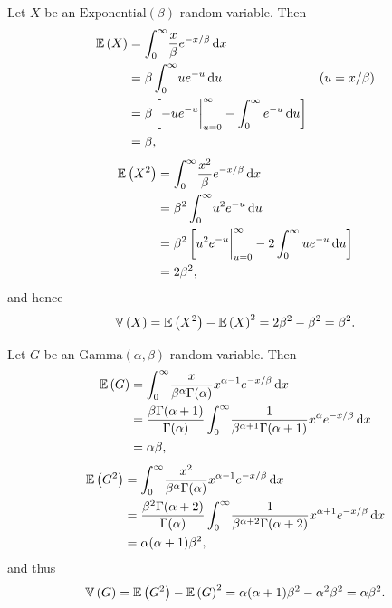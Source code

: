 \begin{ex}
  Let $X$ be an $\text{Exponential}(\beta)$ random variable. Then
  \begin{align*}
    \mathbb{E}\left(X\right)
     & =\int_0^\infty\!\frac{x}{\beta}e^{-x/\beta}\,\mathrm{d}{x}                                            \\
     & =\beta\int_0^\infty\!ue^{-u}\,\mathrm{d}{u}                                             & (u=x/\beta) \\
     & =\beta\left[-ue^{-u}\bigg\rvert_{u=0}^\infty-\int_0^\infty e^{-u}\,\mathrm{d}{u}\right]               \\
     & =\beta,
  \end{align*}
  \begin{align*}
    \mathbb{E}\left(X^2\right)
     & =\int_0^\infty\!\frac{x^2}{\beta}e^{-x/\beta}\,\mathrm{d}{x}                                  \\
     & =\beta^2\int_0^\infty\!u^2e^{-u}\,\mathrm{d}{u}                                               \\
     & =\beta^2\left[u^2e^{-u}\bigg\rvert_{u=0}^\infty-2\int_0^\infty ue^{-u}\,\mathrm{d}{u} \right] \\
     & =2\beta^2,
  \end{align*}
  and hence
  \[
    \mathbb{V}\left(X\right)
    =\mathbb{E}\left(X^2\right)-\mathbb{E}\left(X\right)^2
    =2\beta^2-\beta^2=\beta^2.
  \]

  Let $G$ be an $\text{Gamma}(\alpha, \beta)$ random variable. Then
  \begin{align*}
    \mathbb{E}\left(G\right)
     & =\int_0^\infty\!\frac{x}{\beta^\alpha\Gamma(\alpha)}x^{\alpha-1}e^{-x/\beta}\,\mathrm{d}{x}                                                 \\
     & =\frac{\beta\Gamma(\alpha+1)}{\Gamma(\alpha)}\int_0^\infty\!\frac{1}{\beta^{\alpha+1}\Gamma(\alpha+1)}x^{\alpha}e^{-x/\beta}\,\mathrm{d}{x} \\
     & =\alpha\beta,
  \end{align*}
  \begin{align*}
    \mathbb{E}\left(G^2\right)
     & =\int_0^\infty\!\frac{x^2}{\beta^\alpha\Gamma(\alpha)}x^{\alpha-1}e^{-x/\beta}\,\mathrm{d}{x}                                                   \\
     & =\frac{\beta^2\Gamma(\alpha+2)}{\Gamma(\alpha)}\int_0^\infty\!\frac{1}{\beta^{\alpha+2}\Gamma(\alpha+2)}x^{\alpha+1}e^{-x/\beta}\,\mathrm{d}{x} \\
     & =\alpha(\alpha+1)\beta^2,
  \end{align*}
  and thus
  \[
    \mathbb{V}\left(G\right)
    =\mathbb{E}\left(G^2\right)-\mathbb{E}\left(G\right)^2
    =\alpha(\alpha+1)\beta^2-\alpha^2\beta^2
    =\alpha\beta^2.
  \]


\end{ex}
